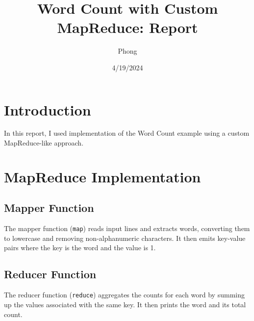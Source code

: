 \documentclass{article}
\begin{document}
\title{Word Count with Custom MapReduce: Report}
\author{Phong}
\date{4/19/2024}
\maketitle
\section{Introduction}
In this report, I used implementation of the Word Count example using a custom MapReduce-like approach.
\section{MapReduce Implementation}
\subsection{Mapper Function}
The mapper function (\texttt{map}) reads input lines and extracts words, converting them to lowercase and removing non-alphanumeric characters. It then emits key-value pairs where the key is the word and the value is 1.
\subsection{Reducer Function}
The reducer function (\texttt{reduce}) aggregates the counts for each word by summing up the values associated with the same key. It then prints the word and its total count.
\end{document}

